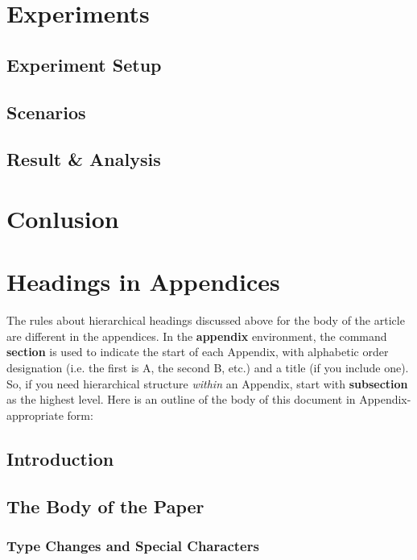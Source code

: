 \documentclass{sig-alternate}
\begin{document}
\section{Experiments}
\subsection{Experiment Setup}
\subsection{Scenarios}
\subsection{Result \& Analysis}



\section{Conlusion}


 

\appendix
\section{Headings in Appendices}
The rules about hierarchical headings discussed above for
the body of the article are different in the appendices.
In the \textbf{appendix} environment, the command
\textbf{section} is used to
indicate the start of each Appendix, with alphabetic order
designation (i.e. the first is A, the second B, etc.) and
a title (if you include one).  So, if you need
hierarchical structure
\textit{within} an Appendix, start with \textbf{subsection} as the
highest level. Here is an outline of the body of this
document in Appendix-appropriate form:
\subsection{Introduction}
\subsection{The Body of the Paper}
\subsubsection{Type Changes and  Special Characters}
\end{document}
